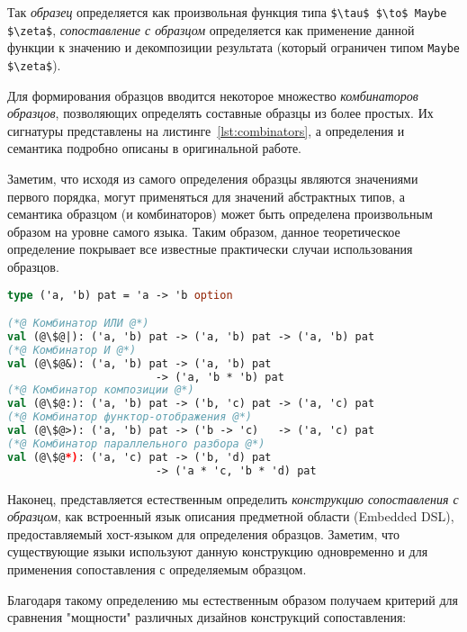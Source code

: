 Так \textit{образец} определяется как произвольная функция типа \linebreak \lstinline|$\tau$ $\to$ Maybe $\zeta$|, \textit{сопоставление с образцом} определяется как применение данной функции к значению и декомпозиции результата (который ограничен типом \lstinline|Maybe $\zeta$|). 

Для формирования образцов вводится некоторое множество \textit{комбинаторов образцов}, позволяющих определять составные образцы из более простых. Их сигнатуры представлены на листинге~\ref{lst:combinators}, а определения и семантика подробно описаны в оригинальной работе.

Заметим, что исходя из самого определения образцы являются значениями первого порядка, могут применяться для значений абстрактных типов, а семантика образцом (и комбинаторов) может быть определена произвольным образом на уровне самого языка. Таким образом, данное теоретическое определение покрывает все известные практически случаи использования образцов.

\noindent
\begin{minipage}{\linewidth}
\begin{lstlisting}[language=ocaml,escapechar=@,label={lst:combinators},caption={Комбинаторы образцов},captionpos=b]
type ('a, 'b) pat = 'a -> 'b option

(*@ Комбинатор ИЛИ @*)
val (@\$@|): ('a, 'b) pat -> ('a, 'b) pat -> ('a, 'b) pat
(*@ Комбинатор И @*)
val (@\$@&): ('a, 'b) pat -> ('a, 'b) pat 
                       -> ('a, 'b * 'b) pat
(*@ Комбинатор композиции @*)
val (@\$@:): ('a, 'b) pat -> ('b, 'c) pat -> ('a, 'c) pat
(*@ Комбинатор функтор-отображения @*)
val (@\$@>): ('a, 'b) pat -> ('b -> 'c)   -> ('a, 'c) pat
(*@ Комбинатор параллельного разбора @*)
val (@\$@*): ('a, 'c) pat -> ('b, 'd) pat 
                       -> ('a * 'c, 'b * 'd) pat
\end{lstlisting}
\end{minipage}

Наконец, представляется естественным определить \textit{конструкцию сопоставления с образцом}, как встроенный язык описания предметной области (Embedded DSL), предоставляемый хост-языком для определения образцов. Заметим, что существующие языки используют данную конструкцию одновременно и для применения сопоставления с определяемым образцом. 

Благодаря такому определению мы естественным образом получаем критерий для сравнения "мощности" различных дизайнов конструкций сопоставления:

